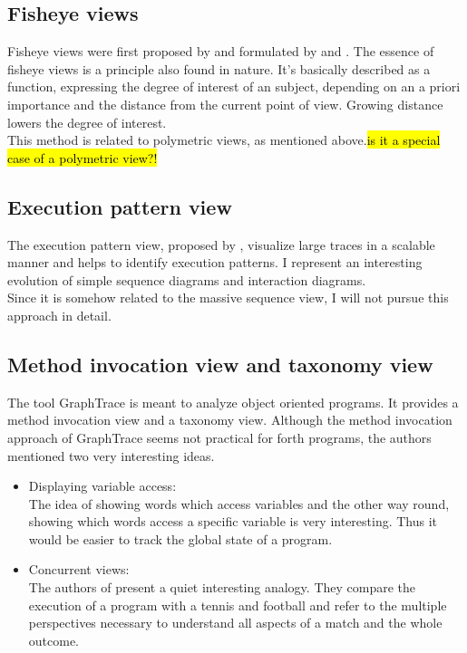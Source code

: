 \subsection*{Fisheye views}
Fisheye views were first proposed by \cite{Furnas:1986:GFV:22627.22342} and formulated by \cite{Storey:1995:GLA:647547.728600} and \cite{Sarkar:1994:GFV:198366.198384}. The essence of fisheye views is a principle also found in nature. It's basically described as a function, expressing the degree of interest of an subject, depending on an a priori importance and the distance from the current point of view. Growing distance lowers the degree of interest.
\\
This method is related to polymetric views, as mentioned above.\hl{is it a special case of a polymetric view?!}

\subsection*{Execution pattern view}
The execution pattern view, proposed by \cite{Pauw98executionpatterns}, visualize large traces in a scalable manner and helps to identify execution patterns. I represent an interesting evolution of simple sequence diagrams and interaction diagrams.
\\
Since it is somehow related to the massive sequence view, I will not pursue this approach in detail.

\subsection*{Method invocation view and taxonomy view}
The tool \gls{GraphTrace}\cite{Kleyn:1988:GOS:62084.62101} is meant to analyze object oriented programs. It provides a method invocation view and a taxonomy view. Although the method invocation approach of GraphTrace seems not practical for forth programs, the authors mentioned two very interesting ideas.
\begin{itemize}
\item Displaying variable access:\\
	The idea of showing words which access variables and the other way round, showing which words access a specific variable is very interesting. Thus it would be easier to track the global state of a program.
\item Concurrent views:\\
	The authors of \cite{Kleyn:1988:GOS:62084.62101} present a quiet interesting analogy. They compare the execution of a program with a tennis and football and refer to the multiple perspectives necessary to understand all aspects of a match and the whole outcome.
\end{itemize}

